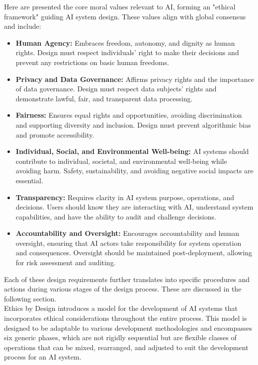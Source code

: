 \documentclass{article}
\begin{document}
Here are presented the core moral values relevant to AI, forming an "ethical framework" guiding AI system design. These values align with global consensus and include:
\begin{itemize}
  \item \textbf{Human Agency:} Embraces freedom, autonomy, and dignity as human rights. Design must respect individuals' right to make their decisions and prevent any restrictions on basic human freedoms.
  \item \textbf{Privacy and Data Governance:} Affirms privacy rights and the importance of data governance. Design must respect data subjects' rights and demonstrate lawful, fair, and transparent data processing.
  \item \textbf{Fairness:} Ensures equal rights and opportunities, avoiding discrimination and supporting diversity and inclusion. Design must prevent algorithmic bias and promote accessibility.
  \item \textbf{Individual, Social, and Environmental Well-being:} AI systems should contribute to individual, societal, and environmental well-being while avoiding harm. Safety, sustainability, and avoiding negative social impacts are essential.
  \item \textbf{Transparency:} Requires clarity in AI system purpose, operations, and decisions. Users should know they are interacting with AI, understand system capabilities, and have the ability to audit and challenge decisions.
  \item \textbf{Accountability and Oversight:} Encourages accountability and human oversight, ensuring that AI actors take responsibility for system operation and consequences. Oversight should be maintained post-deployment, allowing for risk assessment and auditing.
\end{itemize}
Each of these design requirements further translates into specific procedures and actions during various stages of the design process. These are discussed in the following section. \\
Ethics by Design introduces a model for the development of AI systems that incorporates ethical considerations throughout the entire process. This model is designed to be adaptable to various development methodologies and encompasses six generic phases, which are not rigidly sequential but are flexible classes of operations that can be mixed, rearranged, and adjusted to suit the development process for an AI system.
\end{document}
